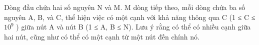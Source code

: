 Dòng đầu chứa hai số nguyên N và M. M dòng tiếp theo, mỗi dòng chứa ba số nguyên A, B, và C, thể hiện việc có một cạnh với khả năng thông qua C (1 ≤ C ≤ $10^{9}$   ) giữa nút A và nút B (1 ≤ A, B ≤ N). Lưu ý rằng có thể có nhiều cạnh giữa hai nút, cũng như có thể có một cạnh từ một nút đến chính nó.